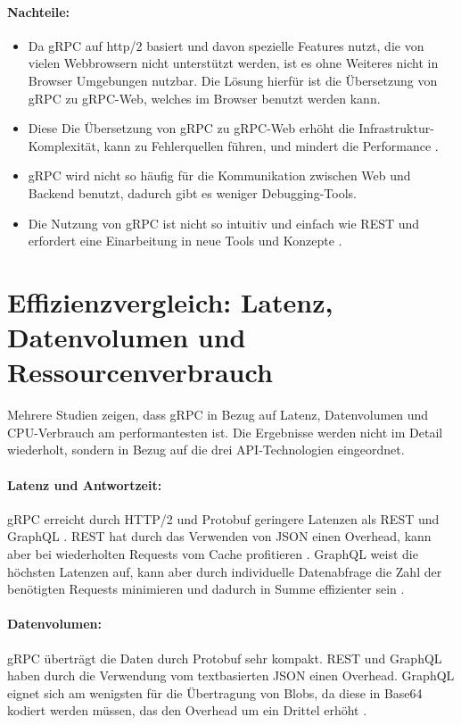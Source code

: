 \paragraph{Nachteile:}
\begin{itemize}
	\item Da gRPC auf http/2 basiert und davon spezielle Features nutzt, die von vielen Webbrowsern nicht unterstützt werden, ist es ohne Weiteres nicht in Browser Umgebungen nutzbar. Die Lösung hierfür ist die Übersetzung von gRPC zu gRPC-Web, welches im Browser benutzt werden kann.
	\item Diese Die Übersetzung von gRPC zu gRPC-Web erhöht die Infrastruktur-Komplexität, kann zu Fehlerquellen führen, und mindert die Performance \parencite{grpc-web-docs}.
	\item gRPC wird nicht so häufig für die Kommunikation zwischen Web und Backend benutzt, dadurch gibt es weniger Debugging-Tools.
	\item Die Nutzung von gRPC ist nicht so intuitiv und einfach wie REST und erfordert eine Einarbeitung in neue Tools und Konzepte \parencite{redhat-apiguide}.
\end{itemize}

\section{Effizienzvergleich: Latenz, Datenvolumen und Ressourcenverbrauch}
Mehrere Studien zeigen, dass gRPC in Bezug auf Latenz, Datenvolumen und CPU-Verbrauch am performantesten ist. Die Ergebnisse werden nicht im Detail wiederholt, sondern in Bezug auf die drei API-Technologien eingeordnet.

\paragraph{Latenz und Antwortzeit:} gRPC erreicht durch HTTP/2 und Protobuf geringere Latenzen als REST und GraphQL \parencite{Niswar2024PerformanceEvaluation,BergRedi2023Benchmarking}. REST hat durch das Verwenden von JSON einen Overhead, kann aber bei wiederholten Requests vom Cache profitieren \parencite{redhat-apiguide}. GraphQL weist die höchsten Latenzen auf, kann aber durch individuelle Datenabfrage die Zahl der benötigten Requests minimieren und dadurch in Summe effizienter sein \parencite{amazon2025graphql}.


\paragraph{Datenvolumen:}  
gRPC überträgt die Daten durch Protobuf sehr kompakt. REST und GraphQL haben durch die Verwendung vom textbasierten JSON einen Overhead. GraphQL eignet sich am wenigsten für die Übertragung von Blobs, da diese in Base64 kodiert werden müssen, das den Overhead um ein Drittel erhöht \parencite{BergRedi2023Benchmarking,redhat-apiguide,amazon2025graphql}.


